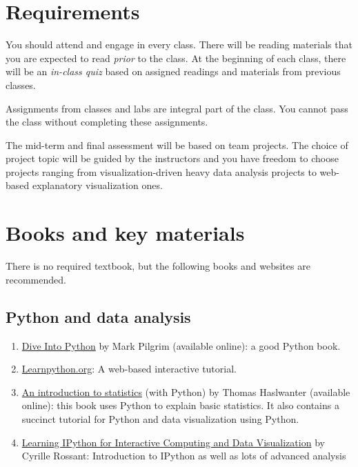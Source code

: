 \documentclass[11pt,article,oneside]{memoir}
\begin{document}
\section{Requirements}
\label{sec:requirements}

You should attend and engage in every class. There will be reading materials
that you are expected to read \emph{prior} to the class. At the beginning of
each class, there will be an \emph{in-class quiz} based on assigned readings
and materials from previous classes.  

Assignments from classes and labs are integral part of the class. You cannot
pass the class without completing these assignments. 

The mid-term and final assessment will be based on team projects. The choice of
project topic will be guided by the instructors and you have freedom to choose
projects ranging from visualization-driven heavy data analysis projects to
web-based explanatory visualization ones. 

\section{Books and key materials}

There is no required textbook, but the following books and websites are
recommended.

\subsection{Python and data analysis}

\begin{enumerate}

\item \href{http://www.diveintopython3.net/index.html}{Dive Into Python} by Mark Pilgrim (available online): a good Python book. 

\item \href{http://www.learnpython.org}{Learnpython.org}: A web-based interactive tutorial. 

\item \href{http://work.thaslwanter.at/Stats/html/}{An introduction to statistics} (with Python) by Thomas Haslwanter (available online): this book uses Python to explain basic statistics. It also contains a succinct tutorial for Python and data visualization using Python. 

\item \href{http://ipython.rossant.net}{Learning IPython for Interactive Computing and Data Visualization} by  Cyrille Rossant: Introduction to IPython as well as lots of advanced analysis 


\end{enumerate}
\end{document}

